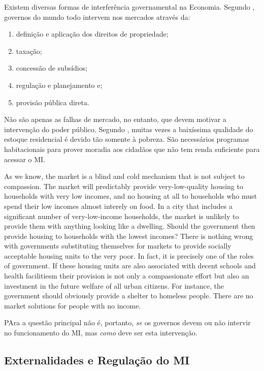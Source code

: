 \documentclass[
	12pt,				%
	oneside,			%
	a4paper,			%
	chapter=TITLE,		%
	section=TITLE,		%
	english,			%
	brazil				%
	]{abntex2}
\begin{document}
\begin{refsection}
Existem diversas formas de interferência governamental na Economia. Segundo
\textcite[p.~6]{urbandevelopment}, governos do mundo todo intervem nos mercados através
da:
\begin{enumerate}
\def\labelenumi{\arabic{enumi}.}
\tightlist
\item
  definição e aplicação dos direitos de propriedade;
\item
  taxação;
\item
  concessão de subsídios;
\item
  regulação e planejamento e;
\item
  provisão pública direta.
\end{enumerate}
Não são apenas as falhas de mercado, no entanto, que devem motivar a intervenção
do poder público. Segundo \textcite[p.~249]{bertaud}, muitas vezes a baixíssima qualidade
do estoque residencial é devido tão somente à pobreza. São necessários programas
habitacionais para prover moradia aos cidadãos que não tem renda suficiente
para acessar o \gls{MI}.
\begin{citacao}
As we know, the market is a blind and cold mechanism that is not subject to
compassion. The market will predictably provide very-low-quality housing to
households with very low incomes, and no housing at all to households who must
spend their low incomes almost interely on food. In a city that includes a 
significant number of very-low-income households, the market is unlikely to
provide them with anything looking like a dwelling. Should the government
then provide housing to households with the lowest incomes?  
There is nothing wrong with governments substituting themselves for markets to
provide socially acceptable housing units to the very poor. In fact, it is
precisely one of the roles of government. If these housing units are also 
associated with decent schools and health facilitiesm their provision is not 
only a compassionate effort but also an investment in the future welfare of
all urban citizens. For instance, the government should obviously provide a
shelter to homeless people. There are no market solutions for people with no
income.
\cite[p.~249]{@bertaud}
\end{citacao}
PAra \textcite[p.~249]{bertaud} a questão principal não é, portanto, \emph{se} os governos
devem ou não intervir no funcionamento do \gls{MI}, mas \emph{como} deve ser esta
intervenção.

\hypertarget{externalidades-e-regulauxe7uxe3o-do}{%
\subsection{\texorpdfstring{Externalidades e Regulação do \gls{MI}}{Externalidades e Regulação do }}\label{externalidades-e-regulauxe7uxe3o-do}}


\end{refsection}
\end{document}
